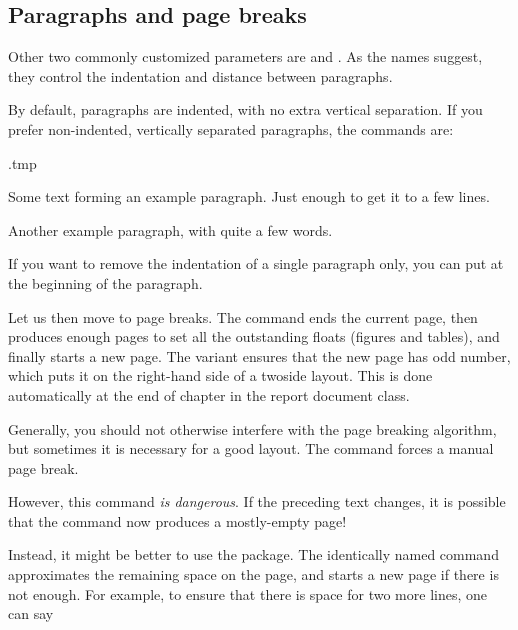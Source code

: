 %
%
\subsection{Paragraphs and page breaks}\label{sec:paragraph layout}

Other two commonly customized parameters are  and .
As the names suggest, they control the indentation and distance between paragraphs.

By default, paragraphs are indented, with no extra vertical separation.
If you prefer non-indented, vertically separated paragraphs, the commands are:
%
\begin{VerbatimOut}{\jobname.tmp}
\setlength\parindent{0pt}
\setlength\parskip{4pt}

Some text forming an example paragraph.
Just enough to get it to a few lines.

Another example paragraph,
with quite a few words.
\end{VerbatimOut}
\ShowExample

If you want to remove the indentation of a single paragraph only,
you can put  at the beginning of the paragraph.

\bigskip

Let us then move to page breaks.
The  command ends the current page,
then produces enough pages to set all the outstanding floats (figures and tables),
and finally starts a new page.
The  variant ensures that the new page has odd number,
which puts it on the right-hand side of a twoside layout.
This is done automatically at the end of chapter in the \textsf{report} document class.

Generally, you should not otherwise interfere with the page breaking algorithm,
but sometimes it is necessary for a good layout.
The  command forces a manual page break.

However, this command \emph{is dangerous}.
If the preceding text changes, it is possible that the  command now produces
a mostly-empty page!

Instead, it might be better to use the  package.
The identically named command approximates the remaining space on the page,
and starts a new page if there is not enough.
For example, to ensure that there is space for two more lines,
one can say
%
\begin{ExampleCode}
\end{ExampleCode}

